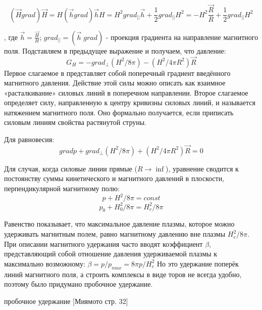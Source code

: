 \documentclass[10pt, a4paper]{article}
\begin{document}
\begin{equation}
(\vec H grad)\vec H=H(\vec h grad)\vec h H=H^{2} grad_{||}\vec h + \frac{1}{2} grad_{||} H^{2}=-H^{2} \frac{\vec R}{R}+\frac{1}{2} grad_{||} H^{2}
\end{equation}


, где $\vec h= \frac{\vec H}{H}$; $grad_{||}=(\vec h \; grad)$ - проекция градиента на направление магнитного поля. Подставляем в предыдущее выражение и получаем, что давление:
\begin{equation}
 G_H=-grad_{\perp}(H^{2}/8\pi)-(H^{2}/4\pi R^{2})\vec R
\end{equation}
Первое слагаемое в представляет собой поперечный градиент введённого магнитного давления. Действие этой силы можно описать как взаимное «расталкивание» силовых линий в поперечном направлении. Второе слагаемое определяет силу, направленную к центру кривизны силовых линий, и называется натяжением магнитного поля. Оно формально получается, если приписать силовым линиям свойства растянутой струны.

Для равновесия: 
\begin{equation}
 grad p + grad_{\perp}(H^{2}/8\pi)+(H^{2}/4\pi R^{2})\vec R =0
\end{equation}

Для случая, когда силовые линии прямые ($R\rightarrow \inf $), уравнение сводится к постоянству суммы кинетического и магнитного давлений в плоскости, перпендикулярной магнитному полю:
\begin{equation}
p + H^{2}/8\pi=const
\end{equation}
\begin{equation}
p_0 + H_{0}^{2}/8\pi=H_{e}^{2}/8\pi
\end{equation}

Равенство показывает, что максимальное давление плазмы, которое можно удерживать магнитным полем, равно магнитному давлению вне плазмы $H_{e}^{2}/8\pi$. При описании магнитного удержания часто вводят коэффициент $\beta$, представляющий собой
отношение давления удерживаемой плазмы к максимально возможному: $\beta=p/p_{max}=8\pi p/H_{e}^{2}$
Но это удержание поперёк линий магнитного поля, а строить комплексы в виде торов не всегда удобно, поэтому было придумано пробочное удержание.

пробочное удержание [Миямото стр. 32]
\end{document}

